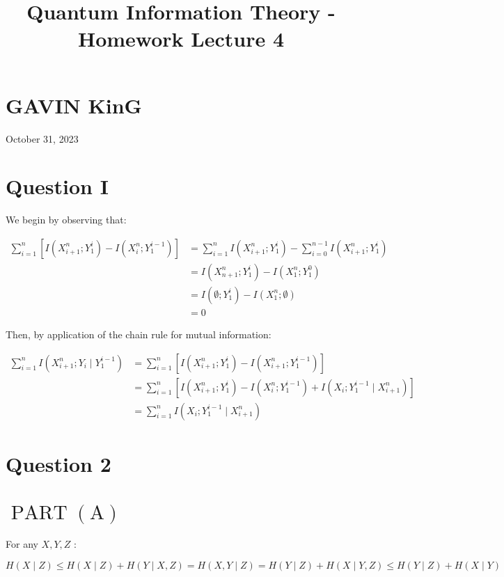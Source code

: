 \documentclass[10pt]{article}
\title{Quantum Information Theory - Homework Lecture 4 }
\author{}
\date{}
\begin{document}
\maketitle
\section*{GAVIN KinG}
October 31, 2023

\section*{Question I}
We begin by observing that:

$$
\begin{aligned}
\sum_{i=1}^{n}\left[I\left(X_{i+1}^{n} ; Y_{1}^{i}\right)-I\left(X_{i}^{n} ; Y_{1}^{i-1}\right)\right] & =\sum_{i=1}^{n} I\left(X_{i+1}^{n} ; Y_{1}^{i}\right)-\sum_{i=0}^{n-1} I\left(X_{i+1}^{n} ; Y_{1}^{i}\right) \\
& =I\left(X_{n+1}^{n} ; Y_{1}^{i}\right)-I\left(X_{1}^{n} ; Y_{1}^{0}\right) \\
& =I\left(\emptyset ; Y_{1}^{i}\right)-I\left(X_{1}^{n} ; \emptyset\right) \\
& =0
\end{aligned}
$$

Then, by application of the chain rule for mutual information:

$$
\begin{aligned}
\sum_{i=1}^{n} I\left(X_{i+1}^{n} ; Y_{i} \mid Y_{1}^{i-1}\right) & =\sum_{i=1}^{n}\left[I\left(X_{i+1}^{n} ; Y_{1}^{i}\right)-I\left(X_{i+1}^{n} ; Y_{1}^{i-1}\right)\right] \\
& =\sum_{i=1}^{n}\left[I\left(X_{i+1}^{n} ; Y_{1}^{i}\right)-I\left(X_{i}^{n} ; Y_{1}^{i-1}\right)+I\left(X_{i} ; Y_{1}^{i-1} \mid X_{i+1}^{n}\right)\right] \\
& =\sum_{i=1}^{n} I\left(X_{i} ; Y_{1}^{i-1} \mid X_{i+1}^{n}\right)
\end{aligned}
$$

\section*{Question 2}
\section*{$\operatorname{PART}(\mathrm{A})$}
For any $X, Y, Z$ :

$$
H(X \mid Z) \leq H(X \mid Z)+H(Y \mid X, Z)=H(X, Y \mid Z)=H(Y \mid Z)+H(X \mid Y, Z) \leq H(Y \mid Z)+H(X \mid Y)
$$
\end{document}
